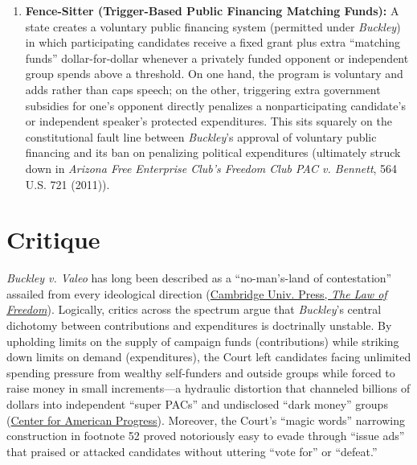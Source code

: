 \documentclass[12pt]{article}
\begin{document}
\begin{enumerate}
  \item \textbf{Fence-Sitter (Trigger-Based Public Financing Matching Funds):} A state creates a voluntary public financing system (permitted under \textit{Buckley}) in which participating candidates receive a fixed grant plus extra ``matching funds'' dollar-for-dollar whenever a privately funded opponent or independent group spends above a threshold. On one hand, the program is voluntary and adds rather than caps speech; on the other, triggering extra government subsidies for one's opponent directly penalizes a nonparticipating candidate's or independent speaker's protected expenditures. This sits squarely on the constitutional fault line between \textit{Buckley}'s approval of voluntary public financing and its ban on penalizing political expenditures (ultimately struck down in \textit{Arizona Free Enterprise Club's Freedom Club PAC v. Bennett}, 564 U.S. 721 (2011)).
\end{enumerate}

\section{Critique}

\textit{Buckley v. Valeo} has long been described as a ``no-man's-land of contestation'' assailed from every ideological direction (\href{https://www.cambridge.org/core/books/law-of-freedom/campaign-finance/67D70830F386B05225DCEF7D8D8C25C7}{Cambridge Univ. Press, \textit{The Law of Freedom}}). Logically, critics across the spectrum argue that \textit{Buckley}'s central dichotomy between contributions and expenditures is doctrinally unstable. By upholding limits on the supply of campaign funds (contributions) while striking down limits on demand (expenditures), the Court left candidates facing unlimited spending pressure from wealthy self-funders and outside groups while forced to raise money in small increments---a hydraulic distortion that channeled billions of dollars into independent ``super PACs'' and undisclosed ``dark money'' groups (\href{https://www.americanprogress.org/article/the-corporate-power-reset-that-makes-citizens-united-irrelevant/}{Center for American Progress}). Moreover, the Court's ``magic words'' narrowing construction in footnote 52 proved notoriously easy to evade through ``issue ads'' that praised or attacked candidates without uttering ``vote for'' or ``defeat.''
\end{document}
